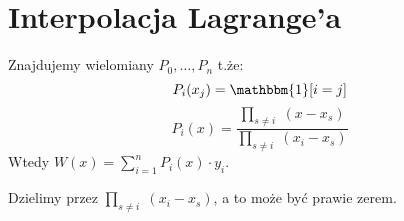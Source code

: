 \section{Interpolacja Lagrange’a}
Znajdujemy wielomiany \( P_0, \dots, P_n \) t.że: \\
\[
    P_i(x_j) = \mathbbm{1}[i=j]
\]
\[
    P_i(x) = \frac{\prod_{s \neq i}\; (x - x_s)}{\prod_{s \neq i}\; (x_i - x_s)}
\]
Wtedy \( W(x) = \sum_{i=1}^{n} P_i(x) \cdot y_i \).

\begin{warning}
    Dzielimy przez \( \prod_{s \neq i}\; (x_i - x_s) \), a to może być prawie zerem.
\end{warning}